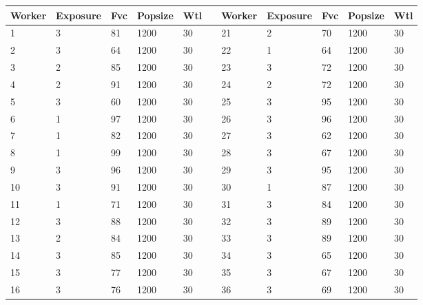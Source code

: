\documentclass[12pt]{article}
\begin{document}
    \begin{table}[ht]
        \begin{longtable}[c]{lllllllllll}
            \hline
            Worker & Exposure & Fvc & Popsize & Wtl &  & Worker & Exposure & Fvc & Popsize & Wtl \\ \hline
            \endfirsthead
            \endhead
            \hline
            \endfoot
            \endlastfoot
            1      & 3        & 81  & 1200    & 30  &  & 21     & 2        & 70  & 1200    & 30  \\
            2      & 3        & 64  & 1200    & 30  &  & 22     & 1        & 64  & 1200    & 30  \\
            3      & 2        & 85  & 1200    & 30  &  & 23     & 3        & 72  & 1200    & 30  \\
            4      & 2        & 91  & 1200    & 30  &  & 24     & 2        & 72  & 1200    & 30  \\
            5      & 3        & 60  & 1200    & 30  &  & 25     & 3        & 95  & 1200    & 30  \\
            6      & 1        & 97  & 1200    & 30  &  & 26     & 3        & 96  & 1200    & 30  \\
            7      & 1        & 82  & 1200    & 30  &  & 27     & 3        & 62  & 1200    & 30  \\
            8      & 1        & 99  & 1200    & 30  &  & 28     & 3        & 67  & 1200    & 30  \\
            9      & 3        & 96  & 1200    & 30  &  & 29     & 3        & 95  & 1200    & 30  \\
            10     & 3        & 91  & 1200    & 30  &  & 30     & 1        & 87  & 1200    & 30  \\
            11     & 1        & 71  & 1200    & 30  &  & 31     & 3        & 84  & 1200    & 30  \\
            12     & 3        & 88  & 1200    & 30  &  & 32     & 3        & 89  & 1200    & 30  \\
            13     & 2        & 84  & 1200    & 30  &  & 33     & 3        & 89  & 1200    & 30  \\
            14     & 3        & 85  & 1200    & 30  &  & 34     & 3        & 65  & 1200    & 30  \\
            15     & 3        & 77  & 1200    & 30  &  & 35     & 3        & 67  & 1200    & 30  \\
            16     & 3        & 76  & 1200    & 30  &  & 36     & 3        & 69  & 1200    & 30  \\

\end{longtable}
\end{table}
\end{document}
